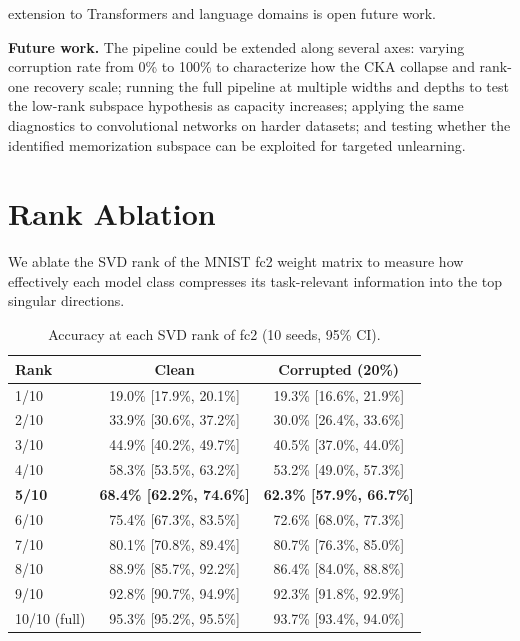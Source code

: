 \documentclass{article}
\begin{document}
extension to Transformers and language domains is open future work.

\textbf{Future work.} The pipeline could be extended along several axes: varying corruption rate from 0\% to 100\% to characterize how the CKA collapse and rank-one recovery scale; running the full pipeline at multiple widths and depths to test the low-rank subspace hypothesis as capacity increases; applying the same diagnostics to convolutional networks on harder datasets; and testing whether the identified memorization subspace can be exploited for targeted unlearning.




\appendix
\section{Rank Ablation}
\label{sec:rank_ablation}

We ablate the SVD rank of the MNIST fc2 weight matrix to measure how effectively each model class compresses its task-relevant information into the top singular directions.

\begin{table}[h]
  \centering
  \caption{Accuracy at each SVD rank of fc2 (10 seeds, 95\% CI).}
  \label{tab:rank_ablation}
  \begin{tabular}{lcc}
    \toprule
    Rank & Clean & Corrupted (20\%) \\
    \midrule
    1/10 & 19.0\% [17.9\%, 20.1\%] & 19.3\% [16.6\%, 21.9\%] \\
    2/10 & 33.9\% [30.6\%, 37.2\%] & 30.0\% [26.4\%, 33.6\%] \\
    3/10 & 44.9\% [40.2\%, 49.7\%] & 40.5\% [37.0\%, 44.0\%] \\
    4/10 & 58.3\% [53.5\%, 63.2\%] & 53.2\% [49.0\%, 57.3\%] \\
    \textbf{5/10} & \textbf{68.4\% [62.2\%, 74.6\%]} & \textbf{62.3\% [57.9\%, 66.7\%]} \\
    6/10 & 75.4\% [67.3\%, 83.5\%] & 72.6\% [68.0\%, 77.3\%] \\
    7/10 & 80.1\% [70.8\%, 89.4\%] & 80.7\% [76.3\%, 85.0\%] \\
    8/10 & 88.9\% [85.7\%, 92.2\%] & 86.4\% [84.0\%, 88.8\%] \\
    9/10 & 92.8\% [90.7\%, 94.9\%] & 92.3\% [91.8\%, 92.9\%] \\
    10/10 (full) & 95.3\% [95.2\%, 95.5\%] & 93.7\% [93.4\%, 94.0\%] \\
    \bottomrule
  \end{tabular}
\end{table}
\end{document}
